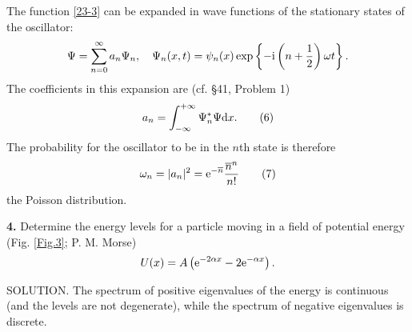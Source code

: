 {The function \eqref{23-3} can be expanded in wave functions of the stationary states of the oscillator:
\[ \Psi=\sum_{n=0}^{\infty}a_n\Psi_n,\quad\Psi_n(x,t)=\psi_n(x)\exp\left\{-\mathrm{i}\left(n+\frac{1}{2} \right)\omega t \right\}. \]
The coefficients in this expansion are (cf. \S41, Problem 1)
\begin{equation}\label{23-6}
a_n=\int_{-\infty}^{+\infty}\Psi_n^*\Psi\mathrm{d} x.\tag{6}
\end{equation}
The probability for the oscillator to be in the $ n $th state is therefore
\begin{equation}\label{23-7}
\omega_n=|a_n|^2=\mathrm{e}^{-\overline{n}}\frac{\overline{n}^n}{n!}\tag{7}
\end{equation}
the Poisson distribution.





\textbf{4.} Determine the energy levels for a particle moving in a field of potential energy (Fig. \ref{Fig.3}; P. M. Morse)
\[ U(x)=A\left(\mathrm{e}^{-2\alpha x}-2\mathrm{e}^{-\alpha x} \right) .\]






SOLUTION. The spectrum of positive eigenvalues of the energy is continuous (and the levels are not degenerate), while the spectrum of negative eigenvalues is discrete.

}
